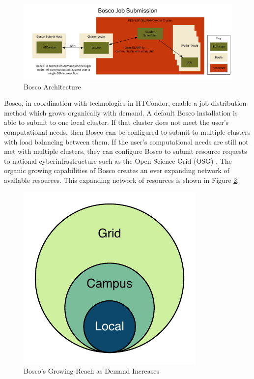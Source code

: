 \begin{figure}[h!t]
	\centering
	\includegraphics[width=\textwidth]{images/ArchitectureGraph1.pdf}
	\caption{Bosco Architecture}
	\label{fig:introboscoarch}
\end{figure}

Bosco, in coordination with technologies in HTCondor, enable a job distribution method which grows organically with demand.  A default Bosco installation is able to submit to one local cluster.  If that cluster does not meet the user's computational needs, then Bosco can be configured to submit to multiple clusters with load balancing between them.  If the user's computational needs are still not met with multiple clusters, they can configure Bosco to submit resource requests to national cyberinfrastructure such as the Open Science Grid (OSG) \cite{pordes2007open}.  The organic growing capabilities of Bosco creates an ever expanding network of available resources. This expanding network of resources is shown in Figure \ref{fig:boscogrowing}.

\begin{figure}[h!t]
	\centering
	\includegraphics{images/BoscoGrowing.pdf}
	\caption{Bosco's Growing Reach as Demand Increases}
	\label{fig:boscogrowing}
\end{figure}

